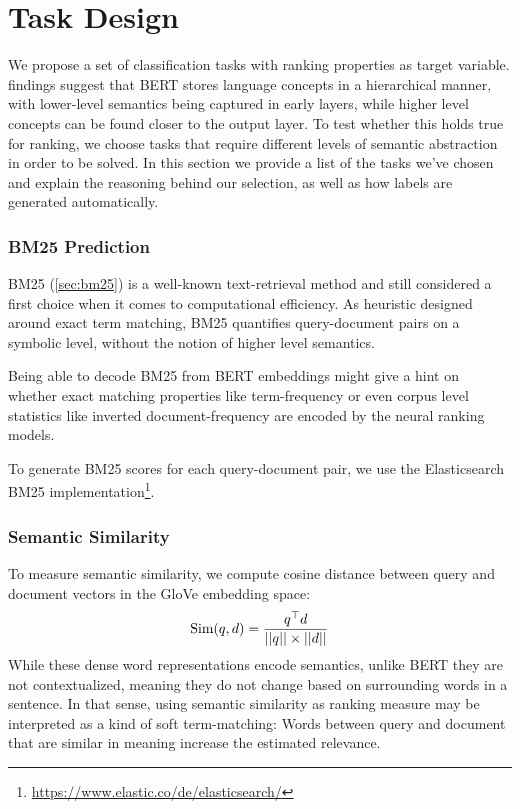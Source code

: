 \section{Task Design}
\label{sec:tasks}
We propose a set of classification tasks with ranking properties as target variable. \cite{tenney-etal-2019-bert} findings suggest that BERT stores language concepts in a hierarchical manner, with lower-level semantics being captured in early layers, while higher level concepts can be found closer to the output layer. To test whether this holds true for ranking, we choose tasks that require different levels of semantic abstraction in order to be solved. In this section we provide a list of the tasks we've chosen and explain the reasoning behind our selection, as well as how labels are generated automatically.

\subsubsection{BM25 Prediction}
BM25 (\autoref{sec:bm25}) is a well-known text-retrieval method and still considered a first choice when it comes to computational efficiency. As heuristic designed around exact term matching, BM25 quantifies query-document pairs on a symbolic level, without the notion of higher level semantics.

Being able to decode BM25 from BERT embeddings might give a hint on whether exact matching properties like term-frequency or even corpus level statistics like inverted document-frequency are encoded by the neural ranking models.

To generate BM25 scores for each query-document pair, we use the Elasticsearch BM25 implementation\footnote{\url{https://www.elastic.co/de/elasticsearch/}}.

\subsubsection{Semantic Similarity}
To measure semantic similarity, we compute cosine distance between query and document vectors in the GloVe\cite{pennington2014glove} embedding space:
\begin{equation}
    \label{eq:sem_sim}
    \text{Sim}(q, d) = \frac{q^\top d}{||q|| \times ||d||}
\end{equation}
While these dense word representations encode semantics, unlike BERT they are not contextualized, meaning they do not change based on surrounding words in a sentence. In that sense, using semantic similarity as ranking measure may be interpreted as a kind of soft term-matching: Words between query and document that are similar in meaning increase the estimated relevance.

